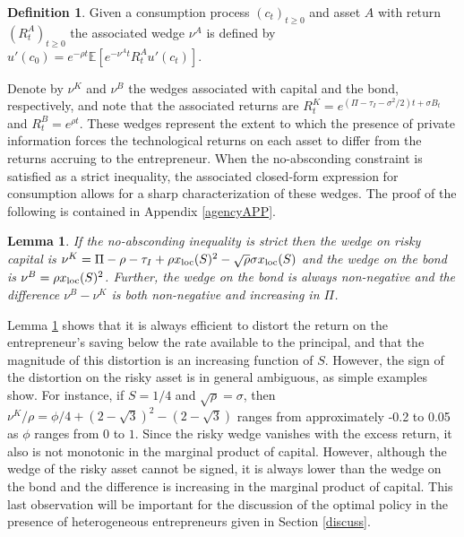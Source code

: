\documentclass[11pt]{article}
\theoremstyle{plain}
\newtheorem{lemma}[thm]{Lemma}
\theoremstyle{definition} %
\newtheorem{defn}{Definition}[section]
\begin{document}
\begin{defn} \label{wedgedefn}
Given a consumption process $(c_t)_{t\geq0}$ and asset $A$ with return $(R^A_t)_{t\geq0}$ the associated wedge $\nu^A$ is defined by $u'(c_0) = e^{-\rho t}\mathbb{E}[ e^{-\nu^At} R^A_t u'(c_t)]$.
\end{defn} 

Denote by $\nu^K$ and $\nu^B$ the wedges associated with capital and the bond, respectively, and note that the associated returns are $R^K_t = e^{{\left(\Pi - \tau_I - \sigma^2/2\right)}t + \sigma B_t}$ and $R^B_t = e^{\rho t}$. These wedges represent the extent to which the presence of private information forces the technological returns on each asset to differ from the returns accruing to the entrepreneur. When the no-absconding constraint is satisfied as a strict inequality, the associated closed-form expression for consumption allows for a sharp characterization of these wedges. The proof of the following is contained in Appendix \ref{agencyAPP}. 

\begin{lemma} \label{LEMMAwedge}
If the no-absconding inequality is strict then the wedge on risky capital is $\nu^K = \Pi - \rho - \tau_I +\rho x_{\textnormal{loc}}(S)^2-\sqrt{\rho} \sigma x_{\textnormal{loc}}(S)$ and the wedge on the bond is $\nu^B = \rho x_{\textnormal{loc}}(S)^2$. Further, the wedge on the bond is always non-negative and the difference $\nu^B - \nu^K$ is both non-negative and increasing in $\Pi$. 
\end{lemma}

Lemma \ref{LEMMAwedge} shows that it is always efficient to distort the return on the entrepreneur's saving below the rate available to the principal, and that the magnitude of this distortion is an increasing function of $S$. However, the sign of the distortion on the risky asset is in general ambiguous, as simple examples show. For instance, if $S = 1/4$ and $\sqrt{\rho} = \sigma$, then $\nu^K/\rho = \phi/4 + (2 - \sqrt{3})^2 - (2 - \sqrt{3})$ ranges from approximately -0.2 to 0.05 as $\phi$ ranges from $0$ to $1$. Since the risky wedge vanishes with the excess return, it also is not monotonic in the marginal product of capital. However, although the wedge of the risky asset cannot be signed, it is always lower than the wedge on the bond and the difference is increasing in the marginal product of capital. This last observation will be important for the discussion of the optimal policy in the presence of heterogeneous entrepreneurs given in Section \ref{discuss}. 
\end{document}
